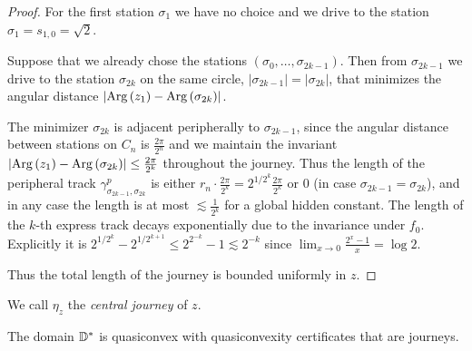 \begin{proof}
For the first station $\sigma_{1}$ we have no choice and we drive
to the station $\sigma_{1}=s_{1,0}=\sqrt{2}$.

Suppose that we already chose the stations $\left(\sigma_{0},\ldots,\sigma_{2k-1}\right)$.
Then from $\sigma_{2k-1}$ we drive to the station $\sigma_{2k}$
on the same circle, $\left|\sigma_{2k-1}\right|=\left|\sigma_{2k}\right|$,
that minimizes the angular distance $\left|\mathrm{Arg}\left(z_{1}\right)-\mathrm{Arg}\left(\sigma_{2k}\right)\right|$. 

The minimizer $\sigma_{2k}$ is adjacent peripherally to $\sigma_{2k-1}$,
since the angular distance between stations on $C_{n}$ is $\frac{2\pi}{2^{n}}$
and we maintain the invariant $\left|\mathrm{Arg}\left(z_{1}\right)-\mathrm{Arg}\left(\sigma_{2k}\right)\right|\leq\frac{2\pi}{2^{k}}$
throughout the journey. Thus the length of the peripheral track $\gamma_{\sigma_{2k-1},\sigma_{2k}}^{p}$
is either $r_{n}\cdot\frac{2\pi}{2^{k}}=2^{1/2^{k}}\frac{2\pi}{2^{k}}$
or $0$ (in case $\sigma_{2k-1}=\sigma_{2k}$), and in any case the
length is at most $\lesssim\frac{1}{2^{k}}$ for a global hidden constant.
The length of the $k$-th express track decays exponentially due to
the invariance under $f_{0}$. Explicitly it is $2^{1/2^{k}}-2^{1/2^{k+1}}\leq2^{2^{-k}}-1\lesssim2^{-k}$
since $\lim_{x\to0}\frac{2^{x}-1}{x}=\log2$.

Thus the total length of the journey is  bounded uniformly in $z$.
\begin{comment}
property $4$ is automatic from property $3$, and the rest are evident
from the construction.
\end{comment}
\end{proof}
%
\begin{comment}
\begin{lemma}
In particular, the length of a suffix $\sigma_{k}+\sigma_{k+1}+\ldots$
decays exponentially in $k$, uniformly in $z$.
\end{lemma}
\end{comment}

We call $\eta_{z}$ the \emph{central journey} of $z$.
\begin{theorem} \label{quasiconvex disk}
The domain $\mathbb{D}^{*}$ is quasiconvex with quasiconvexity certificates
that are journeys.
\end{theorem}

